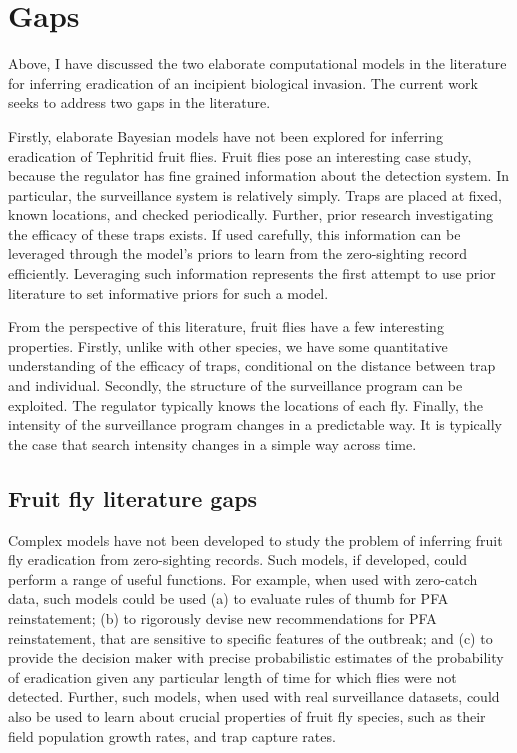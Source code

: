 \documentclass[
  oneside]{book}
\begin{document}
\hypertarget{gaps}{%
\section{Gaps}\label{gaps}}

Above, I have discussed the two elaborate computational models in the literature for inferring eradication of an incipient biological invasion. The current work seeks to address two gaps in the literature.

Firstly, elaborate Bayesian models have not been explored for inferring eradication of Tephritid fruit flies. Fruit flies pose an interesting case study, because the regulator has fine grained information about the detection system. In particular, the surveillance system is relatively simply. Traps are placed at fixed, known locations, and checked periodically. Further, prior research investigating the efficacy of these traps exists. If used carefully, this information can be leveraged through the model's priors to learn from the zero-sighting record efficiently. Leveraging such information represents the first attempt to use prior literature to set informative priors for such a model.

From the perspective of this literature, fruit flies have a few interesting properties. Firstly, unlike with other species, we have some quantitative understanding of the efficacy of traps, conditional on the distance between trap and individual. Secondly, the structure of the surveillance program can be exploited. The regulator typically knows the locations of each fly. Finally, the intensity of the surveillance program changes in a predictable way. It is typically the case that search intensity changes in a simple way across time.

\hypertarget{fruit-fly-literature-gaps}{%
\subsection{Fruit fly literature gaps}\label{fruit-fly-literature-gaps}}

Complex models have not been developed to study the problem of inferring fruit fly eradication from zero-sighting records. Such models, if developed, could perform a range of useful functions. For example, when used with zero-catch data, such models could be used (a) to evaluate rules of thumb for PFA reinstatement; (b) to rigorously devise new recommendations for PFA reinstatement, that are sensitive to specific features of the outbreak; and (c) to provide the decision maker with precise probabilistic estimates of the probability of eradication given any particular length of time for which flies were not detected. Further, such models, when used with real surveillance datasets, could also be used to learn about crucial properties of fruit fly species, such as their field population growth rates, and trap capture rates.
\end{document}
